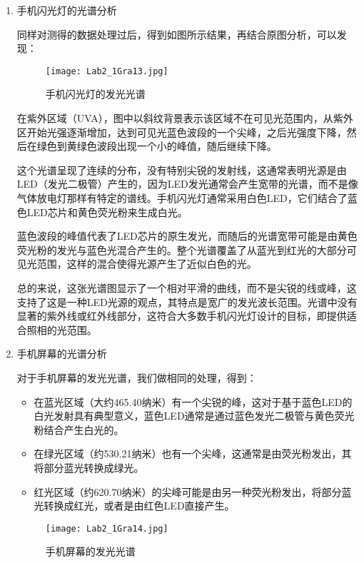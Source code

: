 \documentclass[dvipsnames, svgnames,a4paper,11pt]{article}
\begin{document}
\begin{enumerate}
		
		\item 手机闪光灯的光谱分析
		
		同样对测得的数据处理过后，得到如图所示结果，再结合原图分析，可以发现：
		
		\begin{figure}[htbp]
			\centering
			\texttt{[image: Lab2\_1Gra13.jpg]}
			\caption{手机闪光灯的发光光谱}
			\label{fig:fig13}
		\end{figure}
		
		在紫外区域（UVA），图中以斜纹背景表示该区域不在可见光范围内，从紫外区开始光强逐渐增加，达到可见光蓝色波段的一个尖峰，之后光强度下降，然后在绿色到黄绿色波段出现一个小的峰值，随后继续下降。
		
		这个光谱呈现了连续的分布，没有特别尖锐的发射线，这通常表明光源是由LED（发光二极管）产生的，因为LED发光通常会产生宽带的光谱，而不是像气体放电灯那样有特定的谱线。手机闪光灯通常采用白色LED，它们结合了蓝色LED芯片和黄色荧光粉来生成白光。
		
		蓝色波段的峰值代表了LED芯片的原生发光，而随后的光谱宽带可能是由黄色荧光粉的发光与蓝色光混合产生的。整个光谱覆盖了从蓝光到红光的大部分可见光范围，这样的混合使得光源产生了近似白色的光。
		
		总的来说，这张光谱图显示了一个相对平滑的曲线，而不是尖锐的线或峰，这支持了这是一种LED光源的观点，其特点是宽广的发光波长范围。光谱中没有显著的紫外线或红外线部分，这符合大多数手机闪光灯设计的目标，即提供适合照相的光范围。
				
		\item 手机屏幕的光谱分析
		
		对于手机屏幕的发光光谱，我们做相同的处理，得到：
		
		\begin{itemize}
			\item 在蓝光区域（大约465.40纳米）有一个尖锐的峰，这对于基于蓝色LED的白光发射具有典型意义，蓝色LED通常是通过蓝色发光二极管与黄色荧光粉结合产生白光的。
			\item 在绿光区域（约530.21纳米）也有一个尖峰，这通常是由荧光粉发出，其将部分蓝光转换成绿光。
			\item 红光区域（约620.70纳米）的尖峰可能是由另一种荧光粉发出，将部分蓝光转换成红光，或者是由红色LED直接产生。
		\end{itemize}
		
		\begin{figure}[htbp]
			\centering
			\texttt{[image: Lab2\_1Gra14.jpg]}
			\caption{手机屏幕的发光光谱}
			\label{fig:fig14}
		\end{figure}
		

\end{enumerate}
\end{document}
